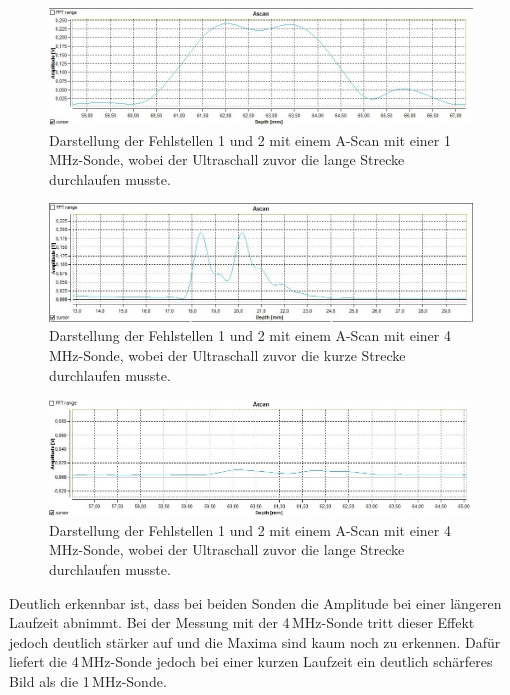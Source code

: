 \begin{figure}[H]
  \centering
  \includegraphics[width=\textwidth]{data/1mhzdoppelteFehlstellelangeLaufzeit.jpg}
  \caption{Darstellung der Fehlstellen 1 und 2 mit einem A-Scan mit einer 1\,MHz-Sonde, wobei der Ultraschall
  zuvor die lange Strecke durchlaufen musste.}
  \label{fig:auflösung2}
\end{figure}

\begin{figure}[H]
  \centering
  \includegraphics[width=\textwidth]{data/4mhzdoppelteFehlstellekurzelLaufzeitGedrehtwieinZeichnung.jpg}
  \caption{Darstellung der Fehlstellen 1 und 2 mit einem A-Scan mit einer 4\,MHz-Sonde, wobei der Ultraschall
  zuvor die kurze Strecke durchlaufen musste.}
  \label{fig:auflösung3}
\end{figure}

\begin{figure}[H]
  \centering
  \includegraphics[width=\textwidth]{data/4mhzdoppelteFehlstellelangeLaufzeit.jpg}
  \caption{Darstellung der Fehlstellen 1 und 2 mit einem A-Scan mit einer 4\,MHz-Sonde, wobei der Ultraschall
  zuvor die lange Strecke durchlaufen musste.}
  \label{fig:auflösung4}
\end{figure}

Deutlich erkennbar ist, dass bei beiden Sonden die Amplitude bei einer längeren
Laufzeit abnimmt. Bei der Messung mit der 4\,MHz-Sonde tritt dieser Effekt jedoch
deutlich stärker auf und die Maxima sind kaum noch zu erkennen. Dafür liefert die
4\,MHz-Sonde jedoch bei einer kurzen Laufzeit ein deutlich schärferes Bild als die
1\,MHz-Sonde.

